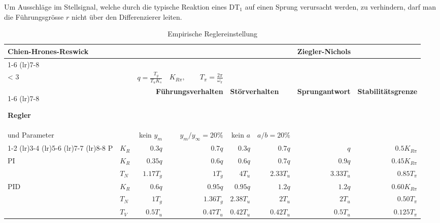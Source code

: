 Um Ausschläge im Stellsignal, welche durch die typische Reaktion eines DT\(_1\) auf einen Sprung verursacht werden, zu verhindern, darf man die Führungsgrösse \(r\) nicht über den Differenzierer leiten.

\begin{table}
	\renewcommand\arraystretch{1.2}
	\centering
	\begin{tabular}{ ll rrrrrr }
		\toprule
		\multicolumn{6}{l}{
			\textbf{Chien-Hrones-Reswick}
		}
		&
		\multicolumn{2}{l}{
			\textbf{Ziegler-Nichols}
		}
		\\ 

		\cmidrule(lr){1-6} \cmidrule(lr){7-8}
		\multicolumn{6}{l}{
			\(\displaystyle
				q = \frac{T_g}{T_uK_S}, \quad
				\mu = \frac{T_g}{T_u} \quad
				\text{wenn } \mu
				\begin{cases}
					> 10 & \text{Strecke gut regelbar} \\
					< 3  & \text{Strecke schlecht regelbar}
				\end{cases}
			\)
		}
		&
		\(\displaystyle q = \frac{T_g}{T_uK_s} \)
		&
		\(\displaystyle K_{R\pi}, \qquad T_\pi = \frac{2\pi}{\omega_\pi}\)
		\\

		\cmidrule(lr){1-6} \cmidrule(lr){7-8}

		\textbf{Regler}
		&
		&
		\multicolumn{2}{p{3.5cm}}{
			\textbf{Führungsverhalten} %
		}
		&
		\multicolumn{2}{l}{
			\textbf{Störverhalten}
		}
		&
		\multicolumn{1}{l}{
			\textbf{Sprungantwort}
		}
		&
		\multicolumn{1}{l}{
			\textbf{Stabilitätsgrenze}
		}
		\\

		\multicolumn{2}{l}{und Parameter}
		& kein $y_m$ & $y_m / y_\infty = 20 \%$ & kein $a$ & $a / b = 20 \%$ & & \\

		\cmidrule(lr){1-2}
		\cmidrule(lr){3-4}
		\cmidrule(lr){5-6}
		\cmidrule(lr){7-7}
		\cmidrule(lr){8-8}
		P & $K_R$ & $0.3q$ & $0.7q$ & $0.3q$ & $0.7q$ & $q$ & $0.5K_{R\pi}$ \\

		PI & $K_R$ & $0.35q$   & $0.6q$ & $0.6q$ & $0.7q$    & $0.9q$    & $0.45K_{R\pi}$ \\
       & $T_N$ & $1.17T_g$ & $1T_g$ & $4T_u$ & $2.33T_u$ & $3.33T_u$ & $0.85T_{\pi}$  \\

		PID & $K_R$ & $0.6q$   & $0.95q$   & $0.95q$   & $1.2q$    & $1.2q$   & $0.60K_{R\pi}$ \\
        & $T_N$ & $1T_g$   & $1.36T_g$ & $2.38T_u$ & $2T_u$    & $2T_u$   & $0.50T_\pi$    \\
        & $T_V$ & $0.5T_u$ & $0.47T_u$ & $0.42T_u$ & $0.42T_u$ & $0.5T_u$ & $0.125T_\pi$   \\
		\bottomrule
	\end{tabular}
	\caption{Empirische Reglereinstellung}
\end{table}

